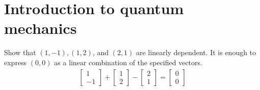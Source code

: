 
\setcounter{chapter}{1}
\chapter{Introduction to quantum mechanics}
 Show that $(1, -1), (1,2)$, and $(2,1)$ are linearly dependent.
\Soln It is enough to express $(0, 0)$ as a linear combination of the specified vectors.
\begin{align*}
	\begin{bmatrix}
		1 \\
		-1
	\end{bmatrix}
	+
	\begin{bmatrix}
		1 \\
		2
	\end{bmatrix}
	-
	\begin{bmatrix}
		2 \\
		1
	\end{bmatrix}
	=
	\begin{bmatrix}
		0 \\
		0
	\end{bmatrix}
\end{align*}

